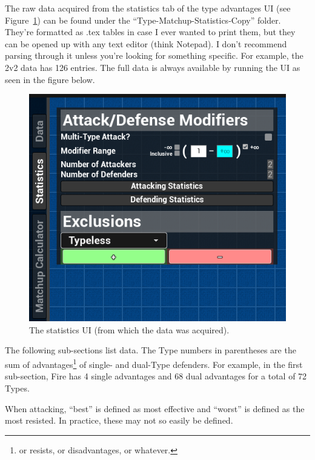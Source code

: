 \newpage

The raw data acquired from the statistics tab of the type advantages UI (see Figure~\ref{fig:stats-ui}) can be found under the ``Type-Matchup-Statistics-Copy'' folder. They're formatted as .tex tables in case I ever wanted to print them, but they can be opened up with any text editor (think Notepad). I don't recommend parsing through it unless you're looking for something specific. For example, the 2v2 data has 126 entries. The full data is always available by running the UI as seen in the figure below.

\begin{figure}[H]
	\begin{center}
		\includegraphics[scale=2]{statistics-ui}
		\caption{The statistics UI (from which the data was acquired).}
		\label{fig:stats-ui}
	\end{center}
\end{figure}

The following sub-sections list data. The Type numbers in parentheses are the sum of advantages\footnote{or resists, or disadvantages, or whatever.} of single- and dual-Type defenders. For example, in the first sub-section, Fire has 4 single advantages and 68 dual advantages for a total of 72 Types.





When attacking, ``best'' is defined as most effective and ``worst'' is defined as the most resisted. In practice, these may not so easily be defined.



